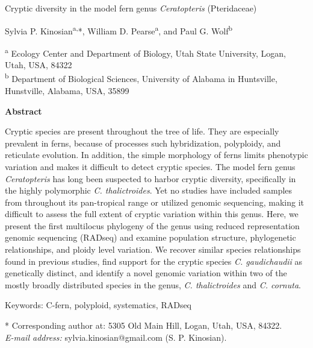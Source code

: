 \documentclass[12pt]{article}
\begin{document}
\begin{flushleft}
{\large{Cryptic diversity in the model fern genus \textit{Ceratopteris} (Pteridaceae)}}

Sylvia P. Kinosian\textsuperscript{a,}*, William D. Pearse\textsuperscript{a}, and Paul G. Wolf\textsuperscript{b}

{\small{\textsuperscript{a} Ecology Center and Department of Biology, Utah State University, Logan, Utah, USA, 84322\\
\textsuperscript{b} Department of Biological Sciences, University of Alabama in Huntsville, Hunstville, Alabama, USA, 35899}}

\textbf{Abstract}

Cryptic species are present throughout the tree of life. They are especially prevalent in ferns, because of processes such hybridization, polyploidy, and reticulate evolution. In addition, the simple morphology of ferns limits phenotypic variation and makes it difficult to detect cryptic species. The model fern genus \textit{Ceratopteris} has long been suspected to harbor cryptic diversity, specifically in the highly polymorphic \textit{C. thalictroides}. Yet no studies have included samples from throughout its pan-tropical range or utilized genomic sequencing, making it difficult to assess the full extent of cryptic variation within this genus. Here, we present the first multilocus phylogeny of the genus using reduced representation genomic sequencing (RADseq) and examine population structure, phylogenetic relationships, and ploidy level variation. We recover similar species relationships found in previous studies, find support for the cryptic species \textit{C. gaudichaudii} as genetically distinct, and identify a novel genomic variation within two of the mostly broadly distributed species in the genus, \textit{C. thalictroides} and \textit{C. cornuta}.

Keywords: C-fern, polyploid, systematics, RADseq

* Corresponding author at: 5305 Old Main Hill, Logan, Utah, USA, 84322. \\ \textit{E-mail address:} sylvia.kinosian@gmail.com (S. P. Kinosian).

\setlength{\parindent}{5ex}

\vspace{30cm}
\end{flushleft}
\end{document}
